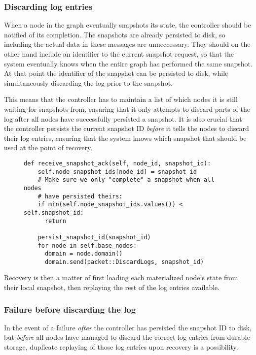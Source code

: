 \documentclass[b5paper]{report}
\begin{document}
\subsubsection{Discarding log entries}
When a node in the graph eventually snapshots its state, the controller should
be notified of its completion. The snapshots are already persisted to disk, so
including the actual data in these messages are unneccessary. They should on the
other hand include an identifier to the current snapshot request, so that the
system eventually knows when the entire graph has performed the same snapshot.
At that point the identifier of the snapshot can be persisted to disk, while
simultaneously discarding the log prior to the snapshot.

This means that the controller has to maintain a list of which nodes it is still
waiting for snapshots from, ensuring that it only attempts to discard parts of
the log after all nodes have successfully persisted a snapshot. It is also
crucial that the controller persists the current snapshot ID \textit{before} it
tells the nodes to discard their log entries, ensuring that the system knows
which snapshot that should be used at the point of recovery.

\begin{figure}[H]
  \begin{lstlisting}[caption="Controller callback for snapshot acknowledgments"]
  def receive_snapshot_ack(self, node_id, snapshot_id):
    self.node_snapshot_ids[node_id] = snapshot_id
    # Make sure we only "complete" a snapshot when all nodes
    # have persisted theirs:
    if min(self.node_snapshot_ids.values()) < self.snapshot_id:
      return

    persist_snapshot_id(snapshot_id)
    for node in self.base_nodes:
      domain = node.domain()
      domain.send(packet::DiscardLogs, snapshot_id)
  \end{lstlisting}
\end{figure}

Recovery is then a matter of first loading each materialized node's state from
their local snapshot, then replaying the rest of the log entries available.

\subsubsection{Failure before discarding the log}
In the event of a failure \textit{after} the controller has persisted the
snapshot ID to disk, but \textit{before} all nodes have managed to discard the
correct log entries from durable storage, duplicate replaying of those log
entries upon recovery is a possibility.
\end{document}
